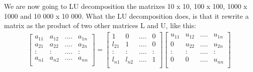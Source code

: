 \documentclass[norsk,a4paper,12pt]{article}
\begin{document}
We are now going to LU decomposition the matrixes 10 x 10, 100 x 100, 1000 x 1000 and 10 000 x 10 000. What the LU decomposition does, is that it rewrite a matrix as the product of two other matrices L and U, like this:
\begin{align*}
\begin{bmatrix}
a_{11} & a_{12} & .... & a_{1n} \\
a_{21} & a_{22} & .... & a_{2n} \\
: & :& .... & : \\
a_{n1} & a_{n2} & .... & a_{nn} \\
\end{bmatrix}
=
\begin{bmatrix}
1 & 0 & .... & 0 \\
l_{21} & 1 & .... & 0 \\
: & :& .... & : \\
l_{n1} & l_{n2} & .... & 1\\
\end{bmatrix}
\begin{bmatrix}
u_{11} & u_{12} & .... & u_{1n} \\
0 & u_{22} & .... & u_{2n} \\
: & :& .... & : \\
0 & 0& .... & u_{nn} \\
\end{bmatrix}
\end{align*}
\end{document}
